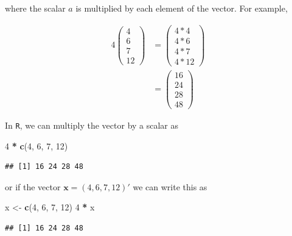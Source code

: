 \documentclass[
]{book}
\newenvironment{Shaded}{\begin{snugshade}}{\end{snugshade}}
\newcommand{\DecValTok}[1]{\textcolor[rgb]{0.00,0.00,0.81}{#1}}
\newcommand{\KeywordTok}[1]{\textcolor[rgb]{0.13,0.29,0.53}{\textbf{#1}}}
\newcommand{\NormalTok}[1]{#1}
\newcommand{\OperatorTok}[1]{\textcolor[rgb]{0.81,0.36,0.00}{\textbf{#1}}}
\newcommand{\StringTok}[1]{\textcolor[rgb]{0.31,0.60,0.02}{#1}}
\theoremstyle{definition}
\theoremstyle{definition}
\theoremstyle{definition}
\theoremstyle{remark}
\begin{document}
where the scalar \(a\) is multiplied by each element of the vector. For example,

\[
\begin{aligned}
4 \begin{pmatrix} 4 \\ 6 \\ 7 \\ 12 \end{pmatrix} 
& = \begin{pmatrix} 4 * 4 \\ 4 * 6 \\ 4 * 7 \\ 4 * 12 \end{pmatrix} \\
& = \begin{pmatrix} 16 \\ 24 \\ 28 \\ 48 \end{pmatrix} 
\end{aligned}
\]

In \texttt{R}, we can multiply the vector by a scalar as

\begin{Shaded}
\begin{Highlighting}[]
\DecValTok{4} \OperatorTok{*}\StringTok{ }\KeywordTok{c}\NormalTok{(}\DecValTok{4}\NormalTok{, }\DecValTok{6}\NormalTok{, }\DecValTok{7}\NormalTok{, }\DecValTok{12}\NormalTok{)}
\end{Highlighting}
\end{Shaded}

\begin{verbatim}
## [1] 16 24 28 48
\end{verbatim}

or if the vector \(\mathbf{x} = \left( 4, 6, 7, 12 \right)'\) we can write this as

\begin{Shaded}
\begin{Highlighting}[]
\NormalTok{x <-}\StringTok{ }\KeywordTok{c}\NormalTok{(}\DecValTok{4}\NormalTok{, }\DecValTok{6}\NormalTok{, }\DecValTok{7}\NormalTok{, }\DecValTok{12}\NormalTok{)}
\DecValTok{4} \OperatorTok{*}\StringTok{ }\NormalTok{x}
\end{Highlighting}
\end{Shaded}

\begin{verbatim}
## [1] 16 24 28 48
\end{verbatim}
\end{document}
